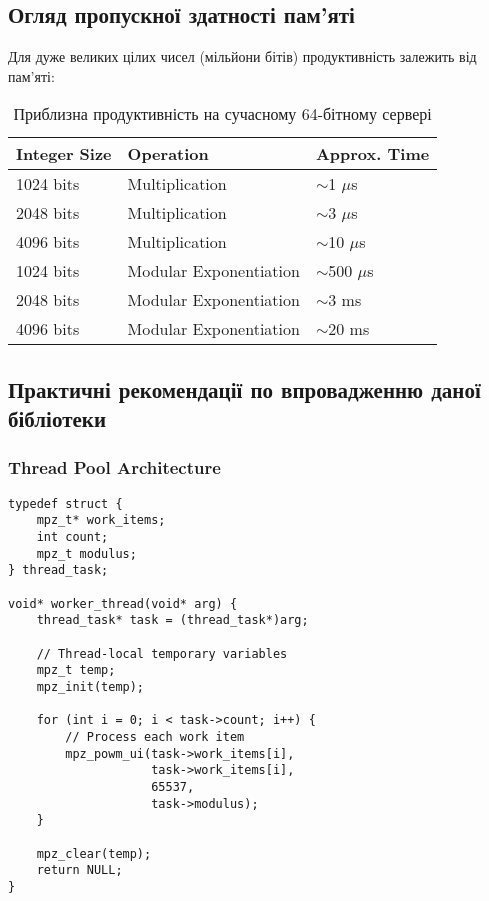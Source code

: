 \subsection{Огляд пропускної здатності пам'яті}

Для дуже великих цілих чисел (мільйони бітів) продуктивність залежить від пам'яті:

\begin{table}[ht]
    \centering
    \begin{tabular}{|l|l|l|}
        \hline
        \textbf{Integer Size} & \textbf{Operation}     & \textbf{Approx. Time} \\
        \hline
        1024 bits             & Multiplication         & $\sim$1 $\mu$s        \\
        2048 bits             & Multiplication         & $\sim$3 $\mu$s        \\
        4096 bits             & Multiplication         & $\sim$10 $\mu$s       \\
        1024 bits             & Modular Exponentiation & $\sim$500 $\mu$s      \\
        2048 bits             & Modular Exponentiation & $\sim$3 ms            \\
        4096 bits             & Modular Exponentiation & $\sim$20 ms           \\
        \hline
    \end{tabular}
    \caption{Приблизна продуктивність на сучасному 64-бітному сервері}
\end{table}

\subsection{Практичні рекомендації по впровадженню даної бібліотеки}

\subsubsection{Thread Pool Architecture}
\begin{verbatim}
typedef struct {
    mpz_t* work_items;
    int count;
    mpz_t modulus;
} thread_task;

void* worker_thread(void* arg) {
    thread_task* task = (thread_task*)arg;
    
    // Thread-local temporary variables
    mpz_t temp;
    mpz_init(temp);
    
    for (int i = 0; i < task->count; i++) {
        // Process each work item
        mpz_powm_ui(task->work_items[i], 
                    task->work_items[i], 
                    65537, 
                    task->modulus);
    }
    
    mpz_clear(temp);
    return NULL;
}
\end{verbatim}

